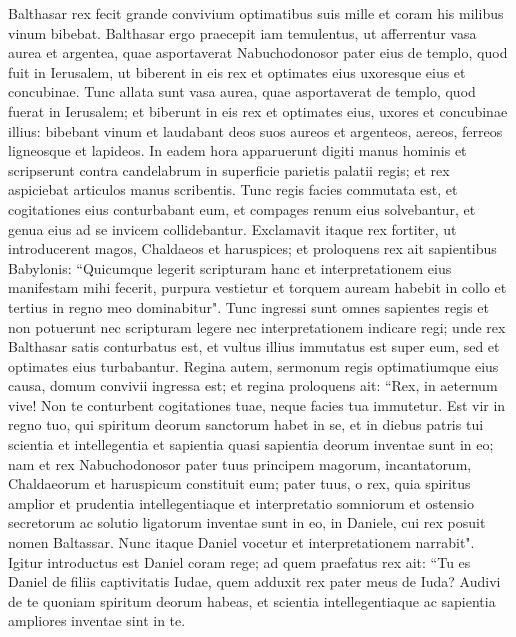 \begin{biblechapter}  
\verse Balthasar rex fecit grande convivium optimatibus suis mille et coram his milibus vinum bibebat. 
\verse Balthasar ergo praecepit iam temulentus, ut afferrentur vasa aurea et argentea, quae asportaverat Nabuchodonosor pater eius de templo, quod fuit in Ierusalem, ut biberent in eis rex et optimates eius uxoresque eius et concubinae. 
\verse Tunc allata sunt vasa aurea, quae asportaverat de templo, quod fuerat in Ierusalem; et biberunt in eis rex et optimates eius, uxores et concubinae illius: 
\verse bibebant vinum et laudabant deos suos aureos et argenteos, aereos, ferreos ligneosque et lapideos. 
\verse In eadem hora apparuerunt digiti manus hominis et scripserunt contra candelabrum in superficie parietis palatii regis; et rex aspiciebat articulos manus scribentis. 
\verse Tunc regis facies commutata est, et cogitationes eius conturbabant eum, et compages renum eius solvebantur, et genua eius ad se invicem collidebantur. 
\verse Exclamavit itaque rex fortiter, ut introducerent magos, Chaldaeos et haruspices; et proloquens rex ait sapientibus Babylonis: “Quicumque legerit scripturam hanc et interpretationem eius manifestam mihi fecerit, purpura vestietur et torquem auream habebit in collo et tertius in regno meo dominabitur". 
\verse Tunc ingressi sunt omnes sapientes regis et non potuerunt nec scripturam legere nec interpretationem indicare regi; 
\verse unde rex Balthasar satis conturbatus est, et vultus illius immutatus est super eum, sed et optimates eius turbabantur. 
\verse Regina autem, sermonum regis optimatiumque eius causa, domum convivii ingressa est; et regina proloquens ait: “Rex, in aeternum vive! Non te conturbent cogitationes tuae, neque facies tua immutetur. 
\verse Est vir in regno tuo, qui spiritum deorum sanctorum habet in se, et in diebus patris tui scientia et intellegentia et sapientia quasi sapientia deorum inventae sunt in eo; nam et rex Nabuchodonosor pater tuus principem magorum, incantatorum, Chaldaeorum et haruspicum constituit eum; pater tuus, o rex,  
\verse quia spiritus amplior et prudentia intellegentiaque et interpretatio somniorum et ostensio secretorum ac solutio ligatorum inventae sunt in eo, in Daniele, cui rex posuit nomen Baltassar. Nunc itaque Daniel vocetur et interpretationem narrabit". 
\verse Igitur introductus est Daniel coram rege; ad quem praefatus rex ait: “Tu es Daniel de filiis captivitatis Iudae, quem adduxit rex pater meus de Iuda? 
\verse Audivi de te quoniam spiritum deorum habeas, et scientia intellegentiaque ac sapientia ampliores inventae sint in te. 

\end{biblechapter}
